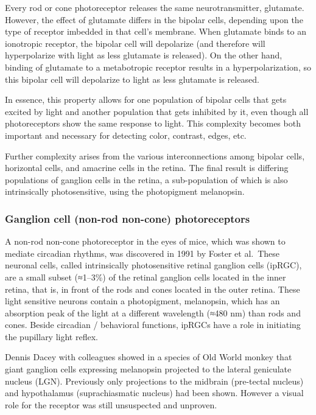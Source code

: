 Every rod or cone photoreceptor releases the same neurotransmitter, glutamate. However, the effect of glutamate differs in the bipolar cells, depending upon the type of receptor imbedded in that cell's membrane. When glutamate binds to an ionotropic receptor, the bipolar cell will depolarize (and therefore will hyperpolarize with light as less glutamate is released). On the other hand, binding of glutamate to a metabotropic receptor results in a hyperpolarization, so this bipolar cell will depolarize to light as less glutamate is released.

In essence, this property allows for one population of bipolar cells that gets excited by light and another population that gets inhibited by it, even though all photoreceptors show the same response to light. This complexity becomes both important and necessary for detecting color, contrast, edges, etc.

Further complexity arises from the various interconnections among bipolar cells, horizontal cells, and amacrine cells in the retina. The final result is differing populations of ganglion cells in the retina, a sub-population of which is also intrinsically photosensitive, using the photopigment melanopsin.

\hypertarget{ganglion-cell-non-rod-non-cone-photoreceptors}{%
\subsubsection{Ganglion cell (non-rod non-cone) photoreceptors}\label{ganglion-cell-non-rod-non-cone-photoreceptors}}

A non-rod non-cone photoreceptor in the eyes of mice, which was shown to mediate circadian rhythms, was discovered in 1991 by Foster et al.~These neuronal cells, called intrinsically photosensitive retinal ganglion cells (ipRGC), are a small subset (≈1--3\%) of the retinal ganglion cells located in the inner retina, that is, in front of the rods and cones located in the outer retina. These light sensitive neurons contain a photopigment, melanopsin, which has an absorption peak of the light at a different wavelength (≈480 nm) than rods and cones. Beside circadian / behavioral functions, ipRGCs have a role in initiating the pupillary light reflex.

Dennis Dacey with colleagues showed in a species of Old World monkey that giant ganglion cells expressing melanopsin projected to the lateral geniculate nucleus (LGN). Previously only projections to the midbrain (pre-tectal nucleus) and hypothalamus (suprachiasmatic nucleus) had been shown. However a visual role for the receptor was still unsuspected and unproven.

